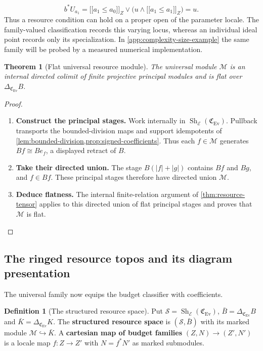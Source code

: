 \documentclass[11pt,a4paper]{article}
\numberwithin{algorithm}{section}
\numberwithin{equation}{section}
\newtheorem{theorem}{Theorem}[section]
\theoremstyle{definition}
\newtheorem{definition}[definition]{Definition}
\theoremstyle{remark}
\theoremstyle{plain}
\newcommand{\E}{\mathcal E}
\newcommand{\incl}{\hookrightarrow}
\newcommand{\llbracket}{\mathopen{[\![}}
\newcommand{\rrbracket}{\mathclose{]\!]}}
\newcommand{\Ev}{{\operatorname{Ev}}}
\newcommand{\abs}[1]{\lvert #1\rvert}
\newcommand{\Cplx}{\mathfrak C_{\Ev}}
\newcommand{\Sh}{\operatorname{Sh}}
\theoremstyle{definition}
\theoremstyle{plain}
\begin{document}
\begin{equation}\label{eq:app-nonconstant-probe}
 b^*U_{a_1}
 =\llbracket a_1\le a_0\rrbracket_Z
   \vee\bigl(u\wedge\llbracket a_1\le a_1\rrbracket_Z\bigr)
 =u.
\end{equation}
Thus a resource condition can hold on a proper open of the parameter
locale.  The family-valued classification records this varying locus,
whereas an individual ideal point records only its specialization.
In \cref{app:complexity-size-example} the same family will be probed
by a measured numerical implementation.

\begin{theorem}[Flat universal resource module]
\label{thm:universal-flat}
The universal module $\mathscr M$ is an internal directed colimit
of finite projective principal modules and is flat over
$\Delta_{\Cplx}B$.
\end{theorem}
\begin{proof}\leavevmode
\begin{enumerate}[leftmargin=*,align=left]
\item \textbf{Construct the principal stages.}
Work internally in $\Sh_\E(\Cplx)$. Pullback transports the
bounded-division maps and support idempotents of
\cref{lem:bounded-division,prop:signed-coefficients}. Thus each
$f\in\mathscr M$ generates $Bf\cong Be_f$, a displayed retract of $B$.

\item \textbf{Take their directed union.}
The stage $B(\abs f+\abs g)$ contains $Bf$ and $Bg$, and $f\in Bf$.
These principal stages therefore have directed union $\mathscr M$.

\item \textbf{Deduce flatness.}
The internal finite-relation argument of \cref{thm:resource-tensor}
applies to this directed union of flat principal stages and proves
that $\mathscr M$ is flat.
\end{enumerate}
\end{proof}

\subsection{The ringed resource topos and its diagram presentation}
\label{sec:structured-resources}
The universal family now equips the budget classifier with coefficients.


\begin{definition}[The structured resource space]\label{def:structured-resource-space}
Put $\mathscr S=\Sh_\E(\Cplx)$, $\bar B=\Delta_{\Cplx}B$ and
$\bar K=\Delta_{\Cplx}K$. The \textbf{structured resource space} is
$(\mathscr S,\bar B)$ with its marked module $\mathscr M\incl\bar K$.
A \textbf{cartesian map of budget families} $(Z,N)\to(Z',N')$ is a locale map $f:Z\to Z'$
with $N=f^*N'$ as marked submodules.
\end{definition}
\end{document}
